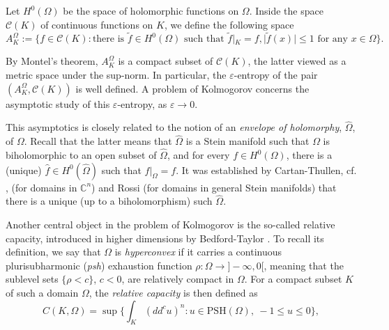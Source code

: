 \documentclass[12pt]{article}
\numberwithin{equation}{section}
\theoremstyle{theorem}
\theoremstyle{definition}
\theoremstyle{remark}
\newcommand{\comp}{\mathbb{C}}
\begin{document}
	Let $H^0(\Omega)$ be the space of holomorphic functions on $\Omega$.
	Inside the space $\mathscr{C}(K)$ of continuous functions on $K$, we define the following space
	\begin{equation}\label{eq_ak_omeg}
		A_K^{\Omega} := 
		\Big\{ f \in \mathscr{C}(K) : \text{there is } \widetilde{f} \in H^0(\Omega) \text{ such that } \widetilde{f}|_K = f, |\widetilde{f}(x)| \leq 1 \text{ for any } x \in \Omega \Big\}.
	\end{equation}
	\par 
	By Montel's theorem, $A_K^{\Omega}$ is a compact subset of $\mathscr{C}(K)$, the latter viewed as a metric space under the sup-norm.
	In particular, the $\varepsilon$-entropy of the pair $(A_K^{\Omega}, \mathscr{C}(K))$ is well defined. 
	A problem of Kolmogorov concerns the asymptotic study of this $\varepsilon$-entropy, as $\varepsilon \to 0$.
	\par
	This asymptotics is closely related to the notion of an \textit{envelope of holomorphy}, $\widehat{\Omega}$, of $\Omega$.
	Recall that the latter means that $\widehat{\Omega}$ is a Stein manifold such that $\Omega$ is biholomorphic to an open subset of $\widehat{\Omega}$, and for every $f \in H^0(\Omega)$, there is a (unique) $\widehat{f} \in H^0(\widehat{\Omega})$ such that $\widehat{f}|_{\Omega} = f$.
	It was established by Cartan-Thullen, cf. \cite[Theorems 5.4.3, 5.4.5]{Hormander}, (for domains in $\comp^n$) and Rossi \cite{RossiEnv} (for domains in general Stein manifolds) that there is a unique (up to a biholomorphism) such $\widehat{\Omega}$.
	\par 
	Another central object in the problem of Kolmogorov is the so-called relative capacity, introduced in higher dimensions by Bedford-Taylor \cite{BedfordTaylor}. 
	To recall its definition, we say that $\Omega$ is \textit{hyperconvex} if it carries a continuous plurisubharmonic (\textit{psh}) exhaustion function $\rho \colon \Omega \to ]-\infty, 0[$, meaning that the sublevel sets $\{\rho < c\}$, $c < 0$, are relatively compact in $\Omega$. 
	For a compact subset $K$ of such a domain $\Omega$, the \emph{relative capacity} is then defined as
	\begin{equation}\label{eq_rel_cap}
		C(K,\Omega)
		=
	  	\sup \Big\{
	    \int_{K} (dd^c u)^n
	    :
	    u \in \mathrm{PSH}(\Omega),\ -1 \leq u \leq 0
	  	\Big\},
	\end{equation}
\end{document}
